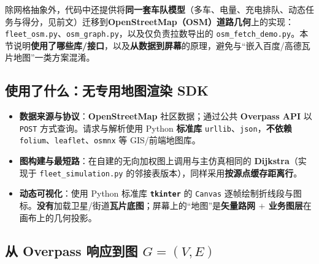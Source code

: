 \documentclass[UTF8,a4paper]{ctexart}
\begin{document}
除网格抽象外，代码中还提供将\textbf{同一套车队模型}（多车、电量、充电排队、动态任务与得分，见前文）迁移到\textbf{OpenStreetMap（OSM）道路几何}上的实现：\texttt{fleet\_osm.py}、\texttt{osm\_graph.py}，以及仅负责拉数导出的 \texttt{osm\_fetch\_demo.py}。本节说明\textbf{使用了哪些库/接口}，以及\textbf{从数据到屏幕}的原理，避免与“嵌入百度/高德瓦片地图”一类方案混淆。

\subsection{使用了什么：无专用地图渲染 SDK}

\begin{itemize}
  \item \textbf{数据来源与协议}：\textbf{OpenStreetMap} 社区数据；通过公共 \textbf{Overpass API} 以 \texttt{POST} 方式查询。请求与解析使用 Python \textbf{标准库} \texttt{urllib}、\texttt{json}，\textbf{不依赖} \texttt{folium}、\texttt{leaflet}、\texttt{osmnx} 等 GIS/前端地图库。
  \item \textbf{图构建与最短路}：在自建的无向加权图上调用与主仿真相同的 \textbf{Dijkstra}（实现于 \texttt{fleet\_simulation.py} 的邻接表版本），同样采用\textbf{按源点缓存距离行}。
  \item \textbf{动态可视化}：使用 Python 标准库 \textbf{\texttt{tkinter}} 的 \texttt{Canvas} 逐帧绘制折线段与图标。\textbf{没有}加载卫星/街道\textbf{瓦片底图}；屏幕上的“地图”是\textbf{矢量路网 $+$ 业务图层}在画布上的几何投影。
\end{itemize}

\subsection[从 Overpass 到路网图]{从 Overpass 响应到图 $G=(V,E)$}
\end{document}
